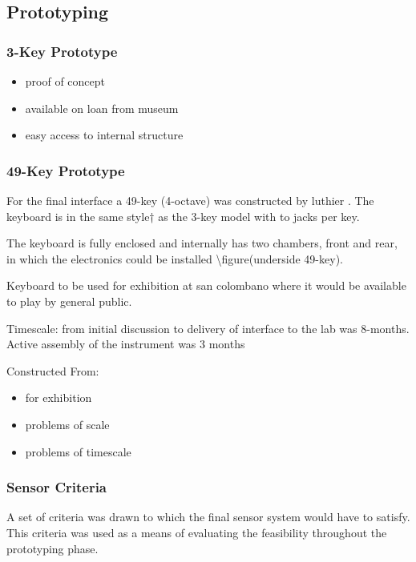 \subsection{Prototyping}\label{prototyping}

\subsubsection{3-Key Prototype}\label{key-prototype}

\begin{itemize}
\item
  proof of concept
\item
  available on loan from museum
\item
  easy access to internal structure
\end{itemize}

\subsubsection{49-Key Prototype}\label{key-prototype-1}

For the final interface a 49-key (4-octave) was constructed by luthier
. The keyboard is in the same style† as the 3-key model with
to jacks per key.

The keyboard is fully enclosed and internally has two chambers, front
and rear, in which the electronics could be installed
\textbackslash figure(underside 49-key).

Keyboard to be used for exhibition at san colombano where it would be
available to play by general public.

Timescale: from initial discussion to delivery of interface to the 
lab was 8-months. Active assembly of the instrument was 3 months

Constructed From:

\begin{itemize}
\item
  for exhibition
\item
  problems of scale
\item
  problems of timescale
\end{itemize}

\subsubsection{Sensor Criteria}\label{sensor-criteria}

A set of criteria was drawn to which the final sensor system would have
to satisfy. This criteria was used as a means of evaluating the
feasibility throughout the prototyping phase.

